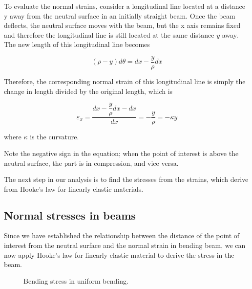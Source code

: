 \documentclass[
10pt,
a4paper,
openany,
svgnames,
]{book}
\begin{document}
To evaluate the normal strains, consider a longitudinal line located at a distance y away from the neutral surface in an initially straight beam. Once the beam deflects, the neutral surface moves with the beam, but the x axis remains fixed and therefore the longitudinal line is still located at the same distance $y$ away. The new length of this longitudinal line becomes

\[(\rho  - y)d\theta  = dx - \dfrac{y}{\rho }dx\]

Therefore, the corresponding normal strain of this longitudinal line is simply the change in length divided by the original length, which is

\begin{equation}
  \varepsilon _x = \frac{dx - \dfrac{y}{\rho }dx - dx}{dx} =  - \dfrac{y}{\rho } =  - \kappa y
\end{equation}

where $\kappa$ is the curvature.

Note the negative sign in the equation; when the point of interest is above the neutral surface, the part is in compression, and vice versa.

The next step in our analysis is to find the stresses from the strains, which derive from Hooke’s law for linearly elastic materials.

\subsection{Normal stresses in beams}

Since we have established the relationship between the distance of the point of interest from the neutral surface and the normal strain in bending beam, we can now apply Hooke’s law for linearly elastic material to derive the stress in the beam.

\begin{figure}[h]
  \centering
  \caption{Bending stress in uniform bending.}
\end{figure}
\end{document}
